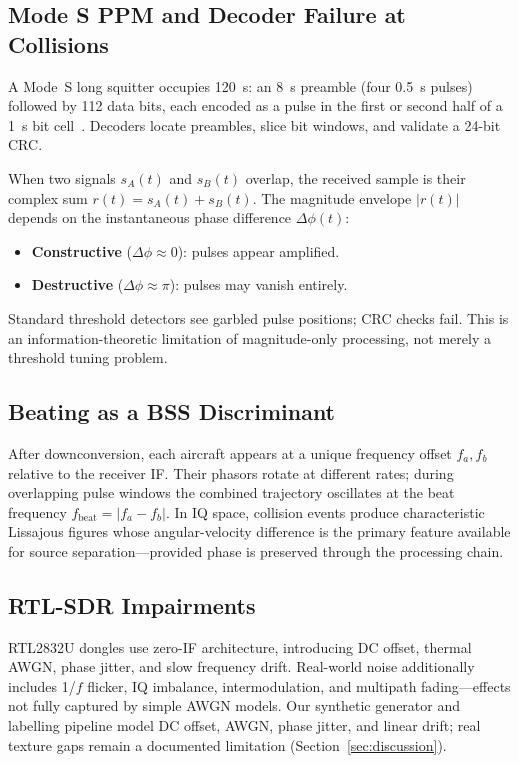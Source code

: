 \documentclass[11pt,a4paper]{article}
\begin{document}
\subsection{Mode S PPM and Decoder Failure at Collisions}

A Mode~S long squitter occupies 120~\textmu s: an 8~\textmu s preamble (four
0.5~\textmu s pulses) followed by 112 data bits, each encoded as a pulse in the
first or second half of a 1~\textmu s bit cell~\cite{rtca_do260b}. Decoders locate preambles, slice
bit windows, and validate a 24-bit CRC.

When two signals $s_A(t)$ and $s_B(t)$ overlap, the received sample is their
complex sum $r(t) = s_A(t) + s_B(t)$. The magnitude envelope $|r(t)|$ depends
on the instantaneous phase difference $\Delta\phi(t)$:
\begin{itemize}[leftmargin=*]
  \item \textbf{Constructive} ($\Delta\phi \approx 0$): pulses appear amplified.
  \item \textbf{Destructive} ($\Delta\phi \approx \pi$): pulses may vanish entirely.
\end{itemize}
Standard threshold detectors see garbled pulse positions; CRC checks fail. This
is an information-theoretic limitation of magnitude-only processing, not
merely a threshold tuning problem.

\subsection{Beating as a BSS Discriminant}

After downconversion, each aircraft appears at a unique frequency offset $f_a,
f_b$ relative to the receiver IF. Their phasors rotate at different rates;
during overlapping pulse windows the combined trajectory oscillates at the beat
frequency $f_{\mathrm{beat}} = |f_a - f_b|$. In IQ space, collision events
produce characteristic Lissajous figures whose angular-velocity difference is
the primary feature available for source separation---provided phase is
preserved through the processing chain.

\subsection{RTL-SDR Impairments}

RTL2832U dongles use zero-IF architecture, introducing DC offset, thermal AWGN,
phase jitter, and slow frequency drift. Real-world noise additionally includes
1/$f$ flicker, IQ imbalance, intermodulation, and multipath fading---effects
not fully captured by simple AWGN models. Our synthetic generator and labelling
pipeline model DC offset, AWGN, phase jitter, and linear drift; real texture
gaps remain a documented limitation (Section~\ref{sec:discussion}).
\end{document}
